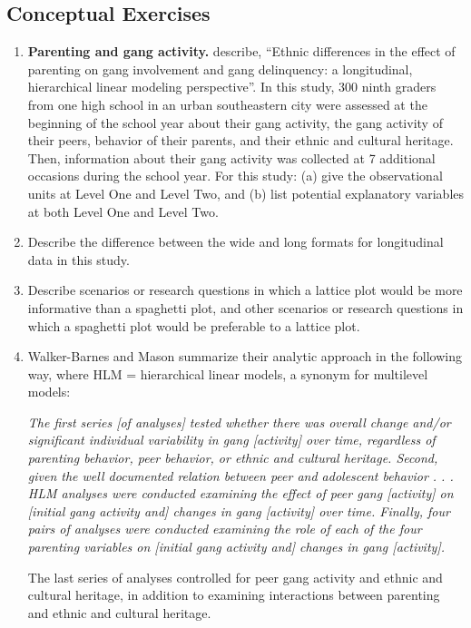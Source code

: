 \documentclass[
]{krantz}
\begin{document}
\hypertarget{conceptual-exercises-6}{%
\subsection{Conceptual Exercises}\label{conceptual-exercises-6}}

\begin{enumerate}
\def\labelenumi{\arabic{enumi}.}
\item
  \textbf{Parenting and gang activity.} \citet{Walker-Barnes2001} describe, ``Ethnic differences in the effect of parenting on gang involvement and gang delinquency: a longitudinal, hierarchical linear modeling perspective''. In this study, 300 ninth graders from one high school in an urban southeastern city were assessed at the beginning of the school year about their gang activity, the gang activity of their peers, behavior of their parents, and their ethnic and cultural heritage. Then, information about their gang activity was collected at 7 additional occasions during the school year. For this study: (a) give the observational units at Level One and Level Two, and (b) list potential explanatory variables at both Level One and Level Two.
\item
  Describe the difference between the wide and long formats for longitudinal data in this study.
\item
  Describe scenarios or research questions in which a lattice plot would be more informative than a spaghetti plot, and other scenarios or research questions in which a spaghetti plot would be preferable to a lattice plot.
\item
  Walker-Barnes and Mason summarize their analytic approach in the following way, where HLM = hierarchical linear models, a synonym for multilevel models:

  \emph{The first series {[}of analyses{]} tested whether there was overall change and/or significant individual variability in gang {[}activity{]} over time, regardless of parenting behavior, peer behavior, or ethnic and cultural heritage. Second, given the well documented relation between peer and adolescent behavior . . . HLM analyses were conducted examining the effect of peer gang {[}activity{]} on {[}initial gang activity and{]} changes in gang {[}activity{]} over time. Finally, four pairs of analyses were conducted examining the role of each of the four parenting variables on {[}initial gang activity and{]} changes in gang {[}activity{]}.}

  The last series of analyses controlled for peer gang activity and ethnic and cultural heritage, in addition to examining interactions between parenting and ethnic and cultural heritage.


\end{enumerate}
\end{document}
